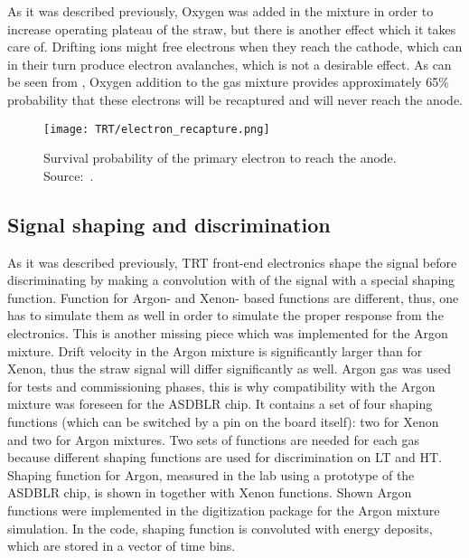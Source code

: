 As it was described previously, Oxygen was added in the mixture in order to increase operating plateau of the straw, but there is another effect which it takes care of.
Drifting ions might free electrons when they reach the cathode, which can in their turn produce electron avalanches, which is not a desirable effect.
As can be seen from , Oxygen addition to the gas mixture provides approximately 65$\%$ probability that these electrons will be recaptured 
and will never reach the anode. 

\begin{figure}
\centering
\texttt{[image: TRT/electron\_recapture.png]}
\caption{ 
 Survival probability of the primary electron to reach the anode. Source:~\cite{esben_thesis}.
}
\label{fig:electron_recapture}
\end{figure}

\subsection{Signal shaping and discrimination}


As it was described previously, 
TRT front-end electronics shape the signal before discriminating by making a convolution with of the signal with a special shaping function. Function for Argon- and Xenon- based functions are different, thus, one has to simulate them as well in order to simulate the proper response from the electronics. 
This is another missing piece which was implemented for the Argon mixture. 
Drift velocity in the Argon mixture is significantly larger than for Xenon, thus the straw signal will differ significantly as well.
Argon gas was used for tests and commissioning phases, this is why compatibility with the Argon mixture was foreseen for the ASDBLR chip. It contains a set of four shaping functions (which can be switched
by a pin on the board itself): two for Xenon and two for Argon mixtures. Two sets of functions are needed for each gas because different shaping functions are used for discrimination on LT and HT. Shaping function for Argon, measured in the lab using a prototype of the ASDBLR chip, is shown in  together with Xenon functions. Shown Argon functions were implemented in the digitization package for the Argon mixture simulation. In the code, shaping function is convoluted with energy deposits, which are stored in a vector of time bins.

